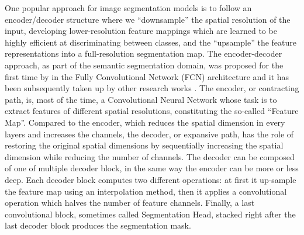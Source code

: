 One popular approach for image segmentation models is to follow an encoder/decoder structure where we “downsample” the spatial resolution of the input, developing lower-resolution feature mappings which are learned to be highly efficient at discriminating between classes, and the “upsample” the feature representations into a full-resolution segmentation map. The encoder-decoder approach, as part of the semantic segmentation domain, was proposed for the first time by \citet{long2015fully} in the Fully Convolutional Network (FCN) architecture and it has been subsequently taken up by other research works \citep{ronneberger2015u,zhao2017pyramid,chen2017rethinking,chen2018encoder,badrinarayanan2017segnet}. The encoder, or contracting path, is, most of the time, a Convolutional Neural Network whose task is to extract features of different spatial resolutions, constituting the so-called “Feature Map”. Compared to the encoder, which reduces the spatial dimension in every layers and increases the channels, the decoder, or expansive path, has the role of restoring the original spatial dimensions by sequentially increasing the spatial dimension while reducing the number of channels. The decoder can be composed of one of multiple decoder block, in the same way the encoder can be more or less deep. Each decoder block computes two different operations: at first it up-sample the feature map using an interpolation method, then it applies a convolutional operation which halves the number of feature channels. Finally, a last convolutional block, sometimes called Segmentation Head, stacked right after the last decoder block produces the segmentation mask.

